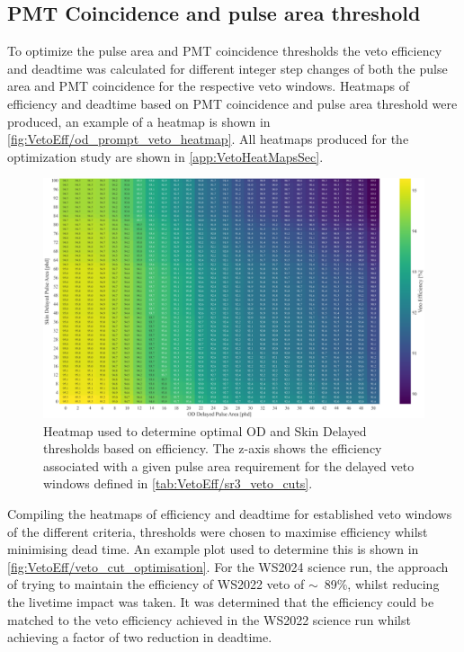 \subsection{PMT Coincidence and pulse area threshold}
To optimize the pulse area and PMT coincidence thresholds the veto efficiency and deadtime was calculated for different integer step changes of both the pulse area and PMT coincidence for the respective veto windows. Heatmaps of efficiency and deadtime based on PMT coincidence and pulse area threshold were produced, an example of a heatmap is shown in \autoref{fig:VetoEff/od_prompt_veto_heatmap}. All heatmaps produced for the optimization study are shown in \autoref{app:VetoHeatMapsSec}.

\begin{figure}
	\centering
	\includegraphics[width=\textwidth]{figures/VetoEfficiency/Heatmap600us_ODDelayedSkinDelayedThresholds.png}
	\caption{Heatmap used to determine optimal OD and Skin Delayed thresholds based on efficiency.
		The z-axis shows the efficiency associated with a given pulse area requirement for the delayed veto windows defined in \autoref{tab:VetoEff/sr3_veto_cuts}.
	}
	\label{fig:VetoEff/od_prompt_veto_heatmap}
\end{figure}

Compiling the heatmaps of efficiency and deadtime for established veto windows of the different criteria, thresholds were chosen to maximise efficiency whilst minimising dead time. An example plot used to determine this is shown in \autoref{fig:VetoEff/veto_cut_optimisation}.
For the WS2024 science run, the approach of trying to maintain the efficiency of WS2022 veto of $\sim$~89\%, whilst reducing the livetime impact was taken. It was determined that the efficiency could be matched to the veto efficiency achieved in the WS2022 science run whilst achieving a factor of two reduction in deadtime.

